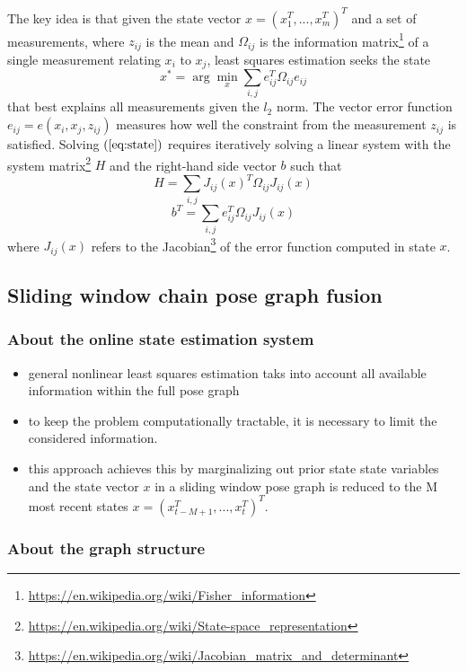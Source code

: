 \documentclass[letterpaper,11pt]{article}
\begin{document}
The key idea is that given the state vector $x=(x_1^T, ..., x_m^T)^T$ and a set of measurements, where $z_{ij}$ is the mean and $\Omega_{ij}$ is the information matrix\footnote{\url{https://en.wikipedia.org/wiki/Fisher_information}} of a single measurement relating $x_i$ to $x_j$, least squares estimation seeks the state
\begin{equation}
x^*=\arg\min_x{\sum_{i,j}e_{ij}^T\Omega_{ij}e_{ij}}
\label{eq:state}
\end{equation}
that best explains all measurements given the $\mathit{l}_2$ norm. The vector error function $e_{ij}=e(x_i,x_j,z_{ij})$ measures how well the constraint from the measurement $z_{ij}$ is satisfied. Solving $(\ref{eq:state})$ requires iteratively solving a linear system with the system matrix\footnote{\url{https://en.wikipedia.org/wiki/State-space_representation}} $H$ and the right-hand side vector $b$ such that
$$H=\sum_{i,j}{J_{ij}(x)^T\Omega_{ij}J_{ij}(x)}$$
$$b^T=\sum_{i,j}e_{ij}^T\Omega_{ij}J_{ij}(x)$$
where $J_{ij}(x)$ refers to the Jacobian\footnote{\url{https://en.wikipedia.org/wiki/Jacobian_matrix_and_determinant}} of the error function computed in state $x$.

\subsection{Sliding window chain pose graph fusion}

\subsubsection{About the online state estimation system}

\begin{itemize}
	\item general nonlinear least squares estimation taks into account all available information within the full pose graph
	\item to keep the problem computationally tractable, it is necessary to limit the considered information.
	\item this approach achieves this by marginalizing out prior state state variables and the state vector $x$ in a sliding window pose graph is reduced to the M most recent states $x=(x_{t-M+1}^T,...,x_t^T)^T$.
\end{itemize}

\subsubsection{About the graph structure}
\end{document}
